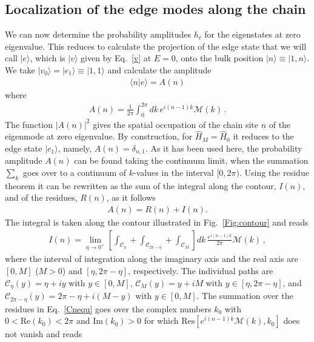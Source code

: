 \documentclass[pra,twocolumn,
superscriptaddress,
showpacs,
aps
]{revtex4-1}
\begin{document}
\subsection{Localization of the edge modes along the chain}

We can now determine the probability amplitudes $h_{\ell}$ for the eigenstates at zero eigenvalue. This reduces to calculate the projection of the edge state that we will call $|e\rangle$, which is $|v\rangle$ given by Eq.~\eqref{v} at $E=0$, onto the bulk position $|n\rangle\equiv |1,n\rangle$. We take $|v_0\rangle=|e_1\rangle\equiv |1,1\rangle$ and calculate the amplitude
\begin{align}
\langle n| e\rangle= A(n)
\end{align}
where
\begin{align}
\label{Cn}
A(n)=\frac{1}{2\pi}\int_{0}^{2\pi}dk\,e^{i(n-1)k}{\mathcal M}(k)\,.
\end{align}
The function $|A(n)|^2$ gives the spatial occupation of the chain site $n$ of the eigenmode at zero eigenvalue. By construction, for   $\hat{H}_M=\hat{H}_0$ it reduces to the edge state $|e_1\rangle$, namely, $A(n)=\delta_{n,1}$. As it has been used here, the probability amplitude $A(n)$ can be found taking the continuum limit, when the summation $\sum_{k}$ goes over to a continuum of $k$-values in the interval $[0,2\pi)$. Using the residue theorem it can be rewritten as the sum of the integral along the contour, $I(n)$, and of the residues, $R(n)$, as it follows
\begin{align}
A(n)= R(n)+I(n).
\label{Cnequ}
\end{align}
The integral is taken along the contour illustrated in Fig.~\ref{Fig:contour} and reads
\begin{align}
I(n)=\lim_{\eta\rightarrow 0^+}\left[\int_{\mathcal{C}_\eta}+ \int_{\mathcal{C}_{2\pi-\eta}}+ \int_{\mathcal{C}_M}\right] dk\,\frac{e^{i(n-1)k}}{2\pi}{\mathcal M}(k)\,,\label{In}
\end{align}
where the interval of integration along the imaginary axis and the real axis are $[0,M]$ ($M>0$) and $[\eta,2\pi-\eta]$, respectively. The individual paths are $\mathcal{C}_{\eta}(y)=\eta+iy$ with $y\in[0,M]$, $\mathcal{C}_{M}(y)=y+iM$ with $y\in[\eta,2\pi-\eta]$, and $\mathcal{C}_{2\pi-\eta}(y)=2\pi-\eta+i(M-y)$ with $y\in[0,M]$. 
The summation over the residues in Eq.~\eqref{Cnequ} goes over the complex numbers $k_0$ with ${0<\mathrm{Re}(k_0)<2\pi}$ and ${\mathrm{Im}(k_0)>0}$ for which $\mathrm{Res}[e^{i(n-1)k}{\mathcal M}(k),k_0]$ does not vanish and reads
\end{document}
